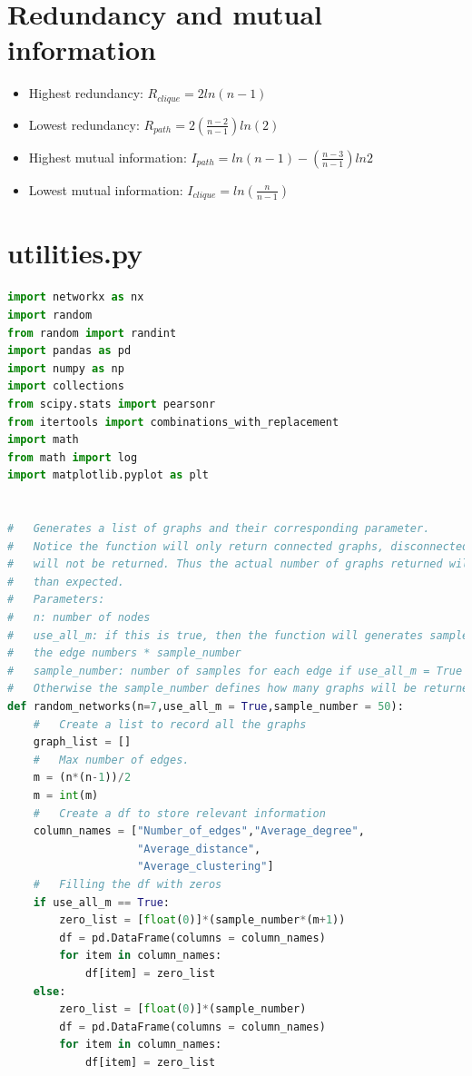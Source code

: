\documentclass[12pt]{article}
\begin{document}
{\appendix
\section{Redundancy and mutual information\cite{KIM20082637}}
\label{r_i_formula}
\begin{itemize}
    \item Highest redundancy: $R_{clique} = 2ln(n-1)$
    \item Lowest redundancy: $R_{path} = 2(\frac{n-2}{n-1})ln(2)$
    \item Highest mutual information: $I_{path} = ln(n-1)-(\frac{n-3}{n-1})ln2$
    \item Lowest mutual information: $I_{clique}=ln(\frac{n}{n-1})$
\end{itemize}

\section{utilities.py}
\label{utilities_code}
\begin{lstlisting}[language=Python,breaklines=true]
import networkx as nx
import random
from random import randint
import pandas as pd
import numpy as np
import collections
from scipy.stats import pearsonr
from itertools import combinations_with_replacement
import math
from math import log
import matplotlib.pyplot as plt


#   Generates a list of graphs and their corresponding parameter.
#   Notice the function will only return connected graphs, disconnected graphs
#   will not be returned. Thus the actual number of graphs returned will be less
#   than expected.
#   Parameters:
#   n: number of nodes
#   use_all_m: if this is true, then the function will generates samples using all
#   the edge numbers * sample_number
#   sample_number: number of samples for each edge if use_all_m = True
#   Otherwise the sample_number defines how many graphs will be returned in total
def random_networks(n=7,use_all_m = True,sample_number = 50):
    #   Create a list to record all the graphs
    graph_list = []
    #   Max number of edges.
    m = (n*(n-1))/2
    m = int(m)
    #   Create a df to store relevant information
    column_names = ["Number_of_edges","Average_degree",
                    "Average_distance",
                    "Average_clustering"]
    #   Filling the df with zeros
    if use_all_m == True:
        zero_list = [float(0)]*(sample_number*(m+1))
        df = pd.DataFrame(columns = column_names)
        for item in column_names:
            df[item] = zero_list 
    else:
        zero_list = [float(0)]*(sample_number)
        df = pd.DataFrame(columns = column_names)
        for item in column_names:
            df[item] = zero_list 
    

\end{lstlisting}}
\end{document}
